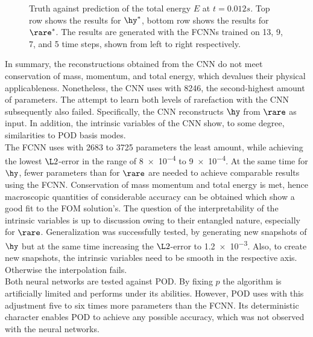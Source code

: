 \begin{figure}
	
	\caption{Truth against prediction of the total energy \(E\) at \(t=0.012s\). Top row shows the results for \(\hy^*\), bottom row shows the results for \(\rare^*\). The results are generated with the FCNNs trained on 13, 9, 7, and 5 time steps, shown from left to right respectively.}
	\label{Fig: Int}
\end{figure}
In summary, the reconstructions obtained from the CNN do not meet conservation of mass, momentum, and total energy, which devalues their physical applicableness. Nonetheless, the CNN uses with 8246, the second-highest amount of parameters. The attempt to learn both levels of rarefaction with the CNN subsequently also failed. Specifically, the CNN reconstructs \(\hy\) from \(\rare\) as input. In addition, the intrinsic variables of the CNN show, to some degree, similarities to POD basis modes. \\
The FCNN uses with 2683 to 3725 parameters the least amount, while achieving the lowest \(\L2\)-error in the range of \num{8e-4} to \num{9e-4}. At the same time for \(\hy\), fewer parameters than for \(\rare\) are needed to achieve comparable results using the FCNN. Conservation of mass momentum and total energy is met, hence macroscopic quantities of considerable accuracy can be obtained which show a good fit to the FOM solution's. The question of the interpretability of the intrinsic variables is up to discussion owing to their entangled nature, especially for \(\rare\). Generalization was successfully tested, by generating new snapshots of \(\hy\) but at the same time increasing the \(\L2\)-error to \num{1.2e-3}. Also, to create new snapshots, the intrinsic variables need to be smooth in the respective axis. Otherwise the interpolation fails.\\
Both neural networks are tested against POD. By fixing \(p\) the algorithm is artificially limited and performs under its abilities. However, POD uses with this adjustment five to six times more parameters than the FCNN. Its deterministic character enables POD to achieve any possible accuracy, which was not observed with the neural networks.    
